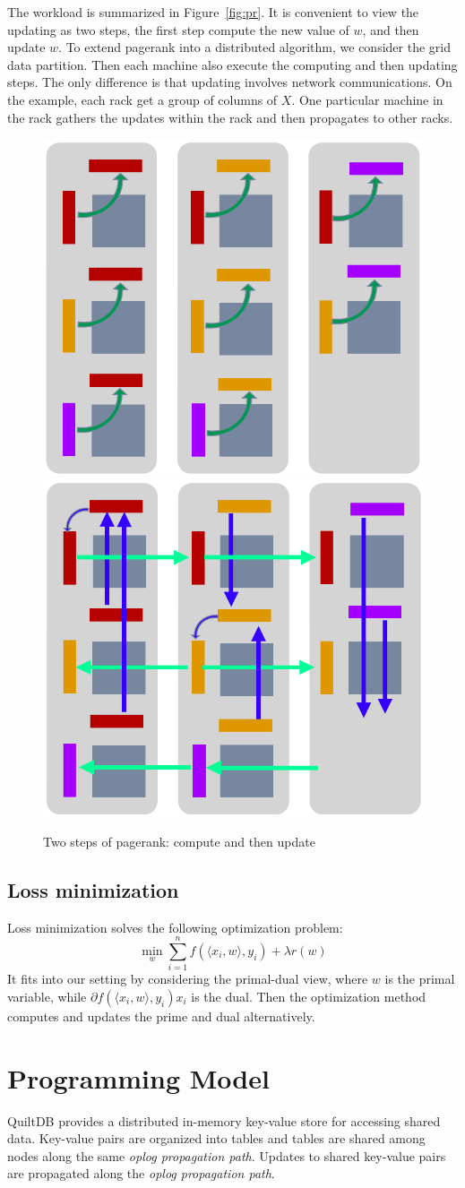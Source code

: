 \documentclass{acm_proc_article-sp}
\begin{document}
The workload is summarized in Figure~\ref{fig:pr}. It is convenient to view the
updating as two steps, the
first step compute the new value of $w$, and then update $w$. To extend pagerank
into a distributed algorithm, we consider the grid data partition. Then each
machine also execute the computing and then updating steps. The only difference
is that updating involves network communications. On the example, each rack get
a group of columns of $X$. One particular  machine in the rack gathers the
updates within the rack and then propagates to other racks.

\begin{figure}[th!]
  \centering
  \includegraphics[width=.25\textwidth]{fig/compute}
  \includegraphics[width=.25\textwidth]{fig/update}
  \caption{Two steps of pagerank: compute and then update}
\end{figure}

\subsection{Loss minimization}

Loss minimization solves the following optimization problem:
\begin{equation}
  \min_w \sum_{i=1}^{n} f(\langle x_i, w\rangle, y_i) + \lambda r(w)
\end{equation}
It fits into our setting by considering the primal-dual view, where $w$ is the primal
variable, while $\partial f(\langle x_i, w\rangle, y_i) x_i$ is the dual. Then
the optimization method computes and updates the prime and dual alternatively.

\section{Programming Model}

QuiltDB provides a distributed in-memory key-value store for accessing shared
data. Key-value pairs are organized into tables and tables are shared among
nodes along the same \emph{oplog propagation path}. Updates to shared key-value
pairs are propagated along the \emph{oplog propagation path}.
\end{document}
